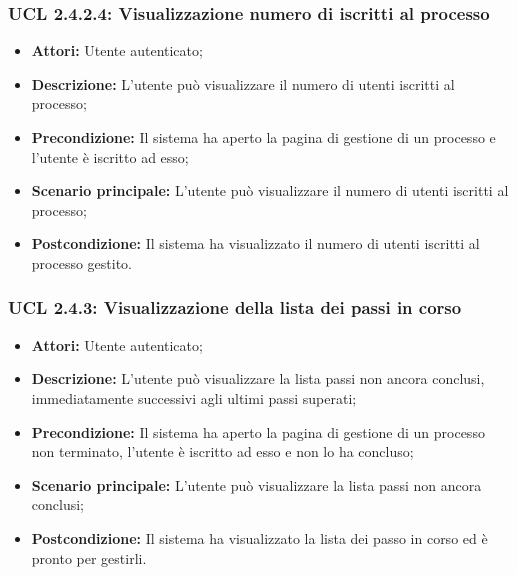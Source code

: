 \hypertarget{L2.4.2.4}{}
\subsubsection{UCL 2.4.2.4: Visualizzazione numero di iscritti al processo}
\begin{itemize}
\item \textbf{Attori:} Utente autenticato;
\item \textbf{Descrizione:} L'utente può visualizzare il numero di utenti iscritti al processo;
\item \textbf{Precondizione:} Il sistema ha aperto la pagina di gestione di un processo e l'utente è iscritto ad esso;
\item \textbf{Scenario principale:} L'utente può visualizzare il numero di utenti iscritti al processo;
\item \textbf{Postcondizione:} Il sistema ha visualizzato il numero di utenti iscritti al processo gestito.
\end{itemize}

\hypertarget{L2.4.3}{}
\subsubsection{UCL 2.4.3: Visualizzazione della lista dei passi in corso}
\begin{itemize}
\item \textbf{Attori:} Utente autenticato;
\item \textbf{Descrizione:} L'utente può visualizzare la lista passi non ancora conclusi, immediatamente successivi agli ultimi passi superati;
\item \textbf{Precondizione:} Il sistema ha aperto la pagina di gestione di un processo non terminato, l'utente è iscritto ad esso e non lo ha concluso;
\item \textbf{Scenario principale:} L'utente può visualizzare la lista passi non ancora conclusi;
\item \textbf{Postcondizione:} Il sistema ha visualizzato la lista dei passo in corso ed è pronto per gestirli.
\end{itemize}

